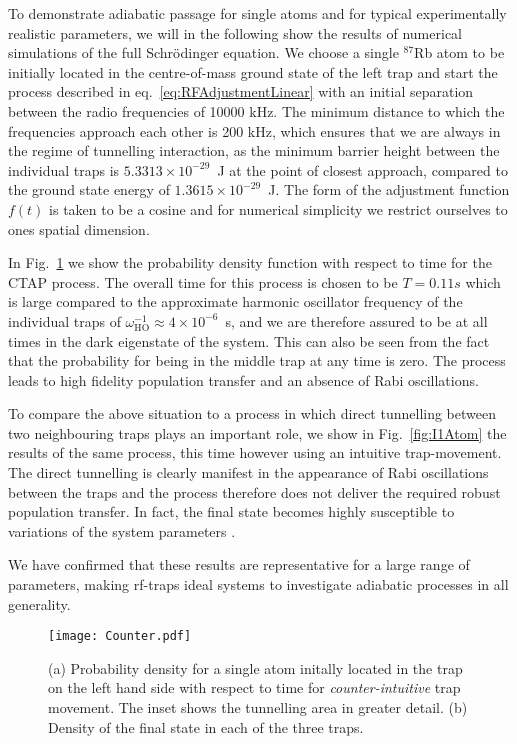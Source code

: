 To demonstrate adiabatic passage for single atoms and for typical
experimentally realistic parameters, we will in the following show the
results of numerical simulations of the full Schr\"odinger
equation. We choose a single $^{87}$Rb atom to be initially located in
the centre-of-mass ground state of the left trap and start the process
described in eq.~\eqref{eq:RFAdjustmentLinear} with an initial
separation between the radio frequencies of 10000 kHz. The minimum
distance to which the frequencies approach each other is 200 kHz,
which ensures that we are always in the regime of tunnelling
interaction, as the minimum barrier height between the individual
traps is $5.3313 \times 10^{-29}$~J at the point of closest approach,
compared to the ground state energy of $1.3615 \times 10^{-29}$~J. The
form of the adjustment function $f(t)$ is taken to be a cosine and for
numerical simplicity we restrict ourselves to ones spatial dimension.

In Fig.~\ref{fig:CI1Atom} we show the probability density function
with respect to time for the CTAP process. The overall time for this
process is chosen to be $T=0.11s$ which is large compared to the
approximate harmonic oscillator frequency of the individual traps of
$\omega^{-1}_\text{HO}\approx 4 \times 10^{-6}$~s, and we are
therefore assured to be at all times in the dark eigenstate of the
system. This can also be seen from the fact that the probability for
being in the middle trap at any time is zero. The process leads to
high fidelity population transfer and an absence of Rabi oscillations.

To compare the above situation to a process in which direct tunnelling
between two neighbouring traps plays an important role, we show in
Fig.~\ref{fig:I1Atom} the results of the same process, this time
however using an intuitive trap-movement. The direct tunnelling is
clearly manifest in the appearance of Rabi oscillations between the
traps and the process therefore does not deliver the required robust
population transfer. In fact, the final state becomes highly
susceptible to variations of the system parameters \cite{Mompart:03}.

We have confirmed that these results are representative for a large
range of parameters, making rf-traps ideal systems to investigate
adiabatic processes in all generality.

\begin{figure}[tb]
  \texttt{[image: Counter.pdf]}
  \caption{(a) Probability density for a single atom initally located
    in the trap on the left hand side with respect to time for {\sl
      counter-intuitive} trap movement. The inset shows the tunnelling
    area in greater detail. (b) Density of the final state in each of
    the three traps.}
\label{fig:CI1Atom}
\end{figure}


